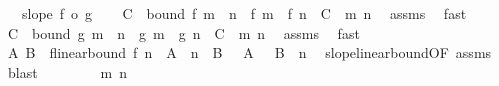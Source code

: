 \begin{isabellebody}
\ \ \ {\isachardoublequoteopen}slope\ {\isacharparenleft}{\kern0pt}f\ o\ g{\isacharparenright}{\kern0pt}{\isachardoublequoteclose}\isanewline
%
\isadelimproof
%
\endisadelimproof
%
\isatagproof
{}\isamarkupfalse%
{\isacharminus}{\kern0pt}\isanewline
\ \ \isamarkupfalse%
\ C\ \ bound{\isacharcolon}{\kern0pt}\ {\isachardoublequoteopen}{\isasymbar}f\ {\isacharparenleft}{\kern0pt}m\ {\isacharplus}{\kern0pt}\ n{\isacharparenright}{\kern0pt}\ {\isacharminus}{\kern0pt}\ {\isacharparenleft}{\kern0pt}f\ m\ {\isacharplus}{\kern0pt}\ f\ n{\isacharparenright}{\kern0pt}{\isasymbar}\ {\isasymle}\ C{\isachardoublequoteclose}\ \ m\ n\ \isamarkupfalse%
\ assms\ \isamarkupfalse%
\ fast\isanewline
\ \ \isamarkupfalse%
\ C{\isacharprime}{\kern0pt}\ \ bound{\isacharprime}{\kern0pt}{\isacharcolon}{\kern0pt}\ {\isachardoublequoteopen}{\isasymbar}g\ {\isacharparenleft}{\kern0pt}m\ {\isacharplus}{\kern0pt}\ n{\isacharparenright}{\kern0pt}\ {\isacharminus}{\kern0pt}\ {\isacharparenleft}{\kern0pt}g\ m\ {\isacharplus}{\kern0pt}\ g\ n{\isacharparenright}{\kern0pt}{\isasymbar}\ {\isasymle}\ C{\isacharprime}{\kern0pt}{\isachardoublequoteclose}\ \ m\ n\ \isamarkupfalse%
\ assms\ \isamarkupfalse%
\ fast\isanewline
\ \ \isamarkupfalse%
\ A\ B\ \ f{\isacharunderscore}{\kern0pt}linear{\isacharunderscore}{\kern0pt}bound{\isacharcolon}{\kern0pt}\ {\isachardoublequoteopen}{\isasymbar}f\ n{\isasymbar}\ {\isasymle}\ A\ {\isacharasterisk}{\kern0pt}\ {\isasymbar}n{\isasymbar}\ {\isacharplus}{\kern0pt}\ B{\isachardoublequoteclose}\ {\isachardoublequoteopen}{}\ {\isasymle}\ A{\isachardoublequoteclose}\ {\isachardoublequoteopen}{}\ {\isasymle}\ B{\isachardoublequoteclose}\ \ n\ \isamarkupfalse%
\ slope{\isacharunderscore}{\kern0pt}linear{\isacharunderscore}{\kern0pt}bound{\isacharbrackleft}{\kern0pt}OF\ assms{\isacharparenleft}{\kern0pt}{}{\isacharparenright}{\kern0pt}{\isacharbrackright}{\kern0pt}\ \isamarkupfalse%
\ blast\isanewline
\ \ \isacommand{{\isacharbraceleft}{\kern0pt}}\isamarkupfalse%
\isanewline
\ \ \ \ \isamarkupfalse%
\ m\ n\isanewline
\ \ \ \ \isamarkupfalse%

\end{isabellebody}
